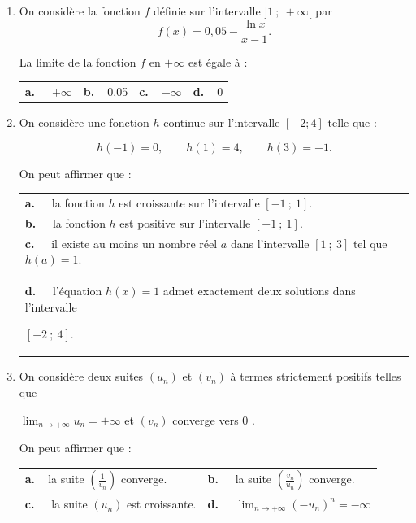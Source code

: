 \documentclass[10pt]{article}
\begin{document}
\begin{enumerate}
\item On considère la fonction $f$ définie sur l'intervalle $]1~;~+\infty[$ par 
\[f(x)= 0,05 - \dfrac{\ln x}{x - 1}.\]

La limite de la fonction $f$ en $+\infty$ est égale à :

\begin{center}
\begin{tabularx}{\linewidth}{*{4}{X}}
\textbf{a.~~} $+\infty$&\textbf{b.~~}0,05&\textbf{c.~~}$-\infty$&\textbf{d.~~}0
\end{tabularx}
\end{center}

\item On considère une fonction $h$ continue sur l'intervalle $[-2 ; 4]$ telle que :

\[h(-1)=0, \qquad h(1) = 4, \qquad h(3) = -1.\]

On peut affirmer que :

\begin{center}
\begin{tabularx}{\linewidth}{X}
\textbf{a.~~} la fonction $h$ est croissante sur l'intervalle $[-1~;~1]$.\\
\textbf{b.~~} la fonction $h$ est positive sur l'intervalle $[-1~;~1]$.\\
\textbf{c.~~} il existe au moins un nombre réel $a$ dans l'intervalle $[1~;~3]$ tel que $h(a) = 1$.\\
\textbf{d.~~} l'équation $h(x)=1$ admet exactement deux solutions dans l'intervalle 

$[-2~;~4]$.
\end{tabularx}
\end{center}

\item On considère deux suites $\left(u_{n}\right)$ et $\left(v_{n}\right)$ à termes strictement positifs telles que 

$\displaystyle\lim _{n \rightarrow+\infty} u_{n}=+\infty$ et $\left(v_{n}\right)$ converge vers 0 .

On peut affirmer que :

\begin{center}
\begin{tabularx}{\linewidth}{*{2}{X}}
\textbf{a.~~}la suite $\left(\frac{1}{v_{n}}\right)$ converge.&
\textbf{b.~~} la suite $\left(\frac{v_{n}}{u_{n}}\right)$ converge.\\
\textbf{c.~~} la suite $\left(u_{n}\right)$ est croissante.&
\textbf{d.~~} $\displaystyle\lim _{n \rightarrow+\infty}\left(-u_{n}\right)^{n}=-\infty$
\end{tabularx}
\end{center}


\end{enumerate}
\end{document}
